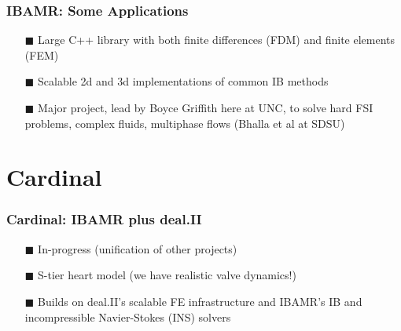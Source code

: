 \documentclass[8pt]{beamer}
\begin{document}
\begin{frame}
    \frametitle{IBAMR: Some Applications}
    \begin{figure}
        \centering
    \end{figure}
    \begin{itemize}
        \item[$\blacksquare$] Large C++ library with both finite differences (FDM) and finite elements (FEM)
        \item[$\blacksquare$] Scalable 2d and 3d implementations of common IB methods
        \item[$\blacksquare$] Major project, lead by Boyce Griffith here at UNC, to solve hard FSI problems,
             complex fluids, multiphase flows (Bhalla et al at SDSU)
    \end{itemize}
\end{frame}

\section{Cardinal}
\begin{frame}
    \frametitle{Cardinal: IBAMR plus deal.II}
    \begin{figure}
        \centering
    \end{figure}
    \begin{itemize}
        \item[$\blacksquare$] In-progress (unification of other projects)
        \item[$\blacksquare$] S-tier heart model (we have realistic valve dynamics!)
        \item[$\blacksquare$] Builds on deal.II's scalable FE infrastructure and 
            IBAMR's IB and incompressible Navier-Stokes (INS) solvers
    \end{itemize}
\end{frame}
\end{document}
